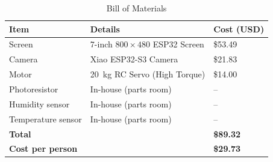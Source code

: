 \documentclass[11pt,letterpaper]{article}
\begin{document}
\begin{table}[H]
    \centering
    \caption{Bill of Materials}
    \label{tab:bom}
    \begin{tabular}{@{}lll@{}}
        \toprule
        \textbf{Item} & \textbf{Details} & \textbf{Cost (USD)} \\
        \midrule
        Screen              & 7-inch \(800\times480\) ESP32 Screen        & \$53.49 \\
        Camera              & Xiao ESP32-S3 Camera                        & \$21.83 \\
        Motor               & \SI{20}{\kilogram} RC Servo (High Torque)   & \$14.00 \\
        Photoresistor       & In-house (parts room)                       & --      \\
        Humidity sensor     & In-house (parts room)                       & --      \\
        Temperature sensor  & In-house (parts room)                       & --      \\
        \midrule
        \textbf{Total}            &                                        & \textbf{\$89.32} \\
        \textbf{Cost per person}  &                                        & \textbf{\$29.73} \\
        \bottomrule
    \end{tabular}
\end{table}
\end{document}
